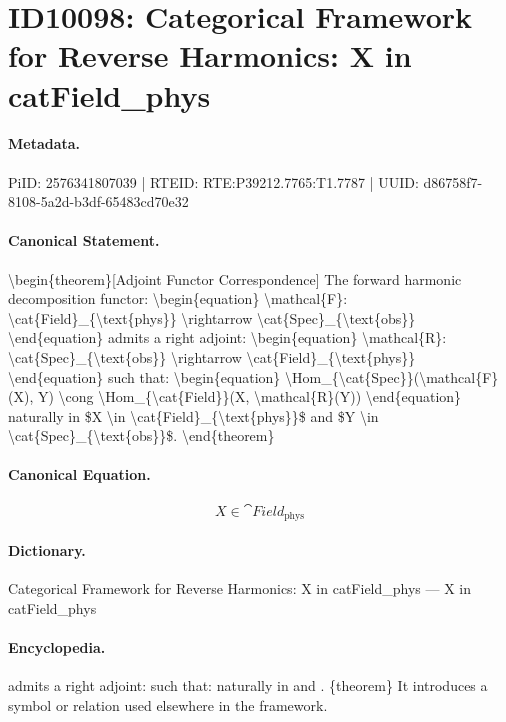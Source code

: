 \section*{ID10098: Categorical Framework for Reverse Harmonics: X in catField\_phys}
\paragraph{Metadata.}
PiID: 2576341807039 | RTEID: RTE:P39212.7765:T1.7787 | UUID: d86758f7-8108-5a2d-b3df-65483cd70e32

\paragraph{Canonical Statement.}
\textbackslash{}begin\{theorem\}[Adjoint Functor Correspondence] The forward harmonic decomposition functor: \textbackslash{}begin\{equation\} \textbackslash{}mathcal\{F\}: \textbackslash{}cat\{Field\}\_\{\textbackslash{}text\{phys\}\} \textbackslash{}rightarrow \textbackslash{}cat\{Spec\}\_\{\textbackslash{}text\{obs\}\} \textbackslash{}end\{equation\} admits a right adjoint: \textbackslash{}begin\{equation\} \textbackslash{}mathcal\{R\}: \textbackslash{}cat\{Spec\}\_\{\textbackslash{}text\{obs\}\} \textbackslash{}rightarrow \textbackslash{}cat\{Field\}\_\{\textbackslash{}text\{phys\}\} \textbackslash{}end\{equation\} such that: \textbackslash{}begin\{equation\} \textbackslash{}Hom\_\{\textbackslash{}cat\{Spec\}\}(\textbackslash{}mathcal\{F\}(X), Y) \textbackslash{}cong \textbackslash{}Hom\_\{\textbackslash{}cat\{Field\}\}(X, \textbackslash{}mathcal\{R\}(Y)) \textbackslash{}end\{equation\} naturally in \$X \textbackslash{}in \textbackslash{}cat\{Field\}\_\{\textbackslash{}text\{phys\}\}\$ and \$Y \textbackslash{}in \textbackslash{}cat\{Spec\}\_\{\textbackslash{}text\{obs\}\}\$. \textbackslash{}end\{theorem\}

\paragraph{Canonical Equation.}
\[
X \in \cat{Field}_{\text{phys}}
\]

\paragraph{Dictionary.}
Categorical Framework for Reverse Harmonics: X in catField\_phys — X in catField\_phys

\paragraph{Encyclopedia.}
admits a right adjoint: such that: naturally in and . \{theorem\} It introduces a symbol or relation used elsewhere in the framework.
